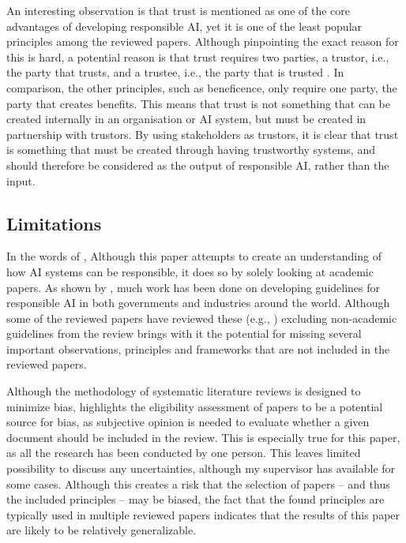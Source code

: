 An interesting observation is that trust is mentioned as one of the core advantages of developing responsible AI, yet it is one of the least popular principles among the reviewed papers. Although pinpointing the exact reason for this is hard, a potential reason is that trust requires two parties, a trustor, i.e., the party that trusts, and a trustee, i.e., the party that is trusted \parencite{Huang_2006_trust}. In comparison, the other principles, such as beneficence, only require one party, the party that creates benefits. This means that trust is not something that can be created internally in an organisation or AI system, but must be created in partnership with trustors. By using stakeholders as trustors, it is clear that trust is something that must be created through having trustworthy systems, and should therefore be considered as the output of responsible AI, rather than the input.


\subsection{Limitations}
\label{sec:Limitations}
In the words of \textcite[p.~2160]{Morley_2020},  Although this paper attempts to create an understanding of how AI systems can be responsible, it does so by solely looking at academic papers. As shown by \textcite{AlgorithmWatch}, much work has been done on developing guidelines for responsible AI in both governments and industries around the world. Although some of the reviewed papers have reviewed these (e.g., \cite{Bélisle-Pipon_2022,Fjeld_2020,Jobin_2019,Ryan_2021}) excluding non-academic guidelines from the review brings with it the potential for missing several important observations, principles and frameworks that are not included in the reviewed papers.

Although the methodology of systematic literature reviews is designed to minimize bias, \textcite{Tranfield_2003} highlights the eligibility assessment of papers to be a potential source for bias, as subjective opinion is needed to evaluate whether a given document should be included in the review. This is especially true for this paper, as all the research has been conducted by one person. This leaves limited possibility to discuss any uncertainties, although my supervisor has available for some cases. Although this creates a risk that the selection of papers -- and thus the included principles -- may be biased, the fact that the found principles are typically used in multiple reviewed papers indicates that the results of this paper are likely to be relatively generalizable.


